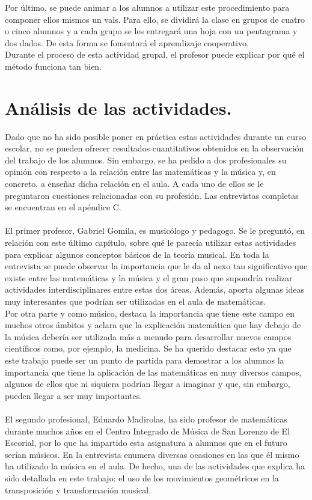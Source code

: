 \documentclass[a4paper, openright, 11pt, titlepage]{report}
\theoremstyle{definition}\newtheorem{defin}[propo]{Definition}
\theoremstyle{definition}\newtheorem{obser}[propo]{Remark}
\theoremstyle{definition}\newtheorem{ejem}[propo]{Ejemplo}
\theoremstyle{definition}\newtheorem{algoritmo}[propo]{Algoritmo}
\begin{document}
Por último, se puede animar a los alumnos a utilizar este procedimiento para componer ellos mismos un vals. Para ello, se dividirá la clase en grupos de cuatro o cinco alumnos y a cada grupo se les entregará una hoja con un pentagrama y dos dados. De esta forma se fomentará el aprendizaje cooperativo.\\
Durante el proceso de esta actividad grupal, el profesor puede explicar por qué el método funciona tan bien.  

\section{Análisis de las actividades.}
Dado que no ha sido posible poner en práctica estas actividades durante un curso escolar, no se pueden ofrecer resultados cuantitativos obtenidos en la observación del trabajo de los alumnos. Sin embargo, se ha pedido a dos profesionales su opinión con respecto a la relación entre las matemáticas y la música y, en concreto, a enseñar dicha relación en el aula. A cada uno de ellos se le preguntaron cuestiones relacionadas con su profesión. Las entrevistas completas se encuentran en el apéndice C.\\\\
El primer profesor, Gabriel Gomila, es musicólogo y pedagogo. Se le preguntó, en relación con este último capítulo, sobre qué le parecía utilizar estas actividades para explicar algunos conceptos básicos de la teoría musical. En toda la entrevista se puede observar la importancia que le da al nexo tan significativo que existe entre las matemáticas y la música y el gran paso que supondría realizar actividades interdisciplinares entre estas dos áreas. Además, aporta algunas ideas muy interesantes que podrían ser utilizadas en el aula de matemáticas.\\
Por otra parte y como músico, destaca la importancia que tiene este campo en muchos otros ámbitos y aclara que la explicación matemática que hay debajo de la música debería ser utilizada más a menudo para desarrollar nuevos campos científicos como, por ejemplo, la medicina. Se ha querido destacar esto ya que este trabajo puede ser un punto de partida para demostrar a los alumnos la importancia que tiene la aplicación de las matemáticas en muy diversos campos, algunos de ellos que ni siquiera podrían llegar a imaginar y que, sin embargo, pueden llegar a ser muy importantes.\\\\
El segundo profesional, Eduardo Madirolas, ha sido profesor de matemáticas durante muchos años en el Centro Integrado de Música de San Lorenzo de El Escorial, por lo que ha impartido esta asignatura a alumnos que en el futuro serían músicos. En la entrevista enumera diversas ocasiones en las que él mismo ha utilizado la música en el aula. De hecho, una de las actividades que explica ha sido detallada en este trabajo: el uso de los movimientos geométricos en la transposición y transformación musical.\\
\end{document}
